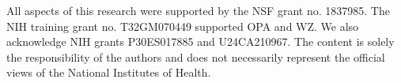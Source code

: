 All aspects of this research were supported by the NSF grant no. 1837985. The NIH training grant no. T32GM070449 supported OPA and WZ. We also acknowledge NIH grants P30ES017885 and U24CA210967. 
The content is solely the responsibility of the authors and does not necessarily represent the official views of the National Institutes of Health.